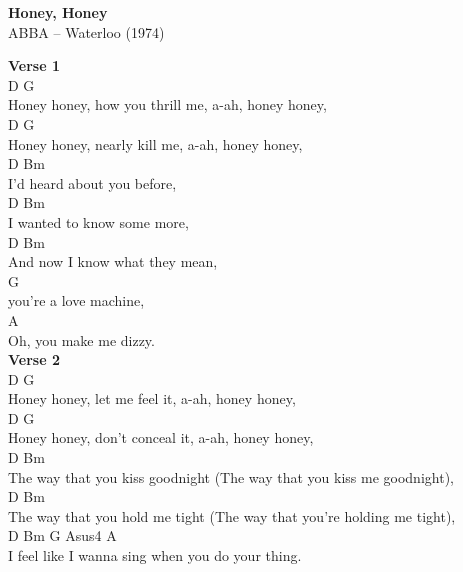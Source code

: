 \documentclass[a4paper]{article}
\begin{document}
    \begin{center}
        \textbf{Honey, Honey}
        ~\\
        ABBA -- Waterloo (1974)
    \end{center}
    {
        \scriptsize
        \textbf{Verse 1}
        ~\\
        {
            \cutive
            \obeyspaces
D                                 G
\\
Honey honey, how you thrill me, a-ah, honey honey,
\\
D                              G
\\
Honey honey, nearly kill me, a-ah, honey honey,
\\
    D                        Bm
\\
I'd heard about you before, 
\\
  D                          Bm
\\
I wanted to know some more,
\\
    D                           Bm
\\
And now I know what they mean, 
\\
                G
\\
you're a love machine,
\\
                   A
\\
Oh, you make me dizzy.
\\

        }
        \textbf{Verse 2}
        ~\\
        {
            \cutive
            \obeyspaces
D                              G
\\
Honey honey, let me feel it, a-ah, honey honey,
\\
D                                G
\\
Honey honey, don't conceal it, a-ah, honey honey,
\\
    D                               Bm
\\
The way that you kiss goodnight (The way that you kiss me goodnight),
\\
    D                              Bm
\\
The way that you hold me tight (The way that you're holding me tight),
\\
  D                   Bm                 G       Asus4  A
\\
I feel like I wanna sing when you do your thing.
\\

}}
\end{document}
